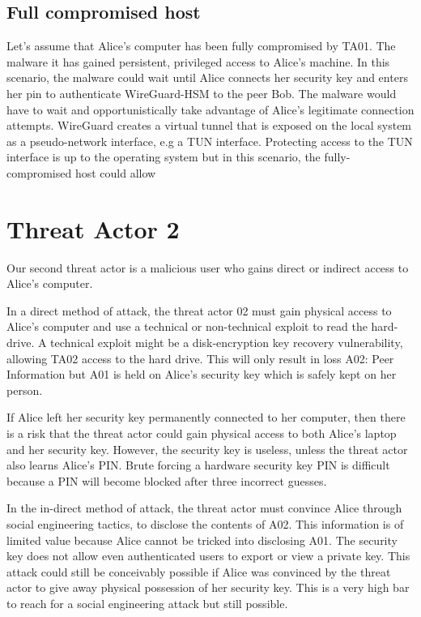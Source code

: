 \documentclass [11pt, proquest] {uwthesis}[2020/02/24]
\begin{document}
\subsection{Full compromised host}
Let's assume that Alice's computer has been fully compromised by TA01. The malware it has gained persistent, privileged access to Alice's machine. In this scenario, the malware could wait until Alice connects her security key and enters her pin to authenticate WireGuard-HSM to the peer Bob. The malware would have to wait and opportunistically take advantage of Alice's legitimate connection attempts.
WireGuard creates a virtual tunnel that is exposed on the local system as a pseudo-network interface, e.g a TUN interface. Protecting access to the TUN interface is up to the operating system but in this scenario, the fully-compromised host could allow


\section{Threat Actor 2}
Our second threat actor is a malicious user who gains direct or indirect access to Alice's computer. 

In a direct method of attack, the threat actor 02 must gain physical access to Alice's computer and use a technical or non-technical exploit to read the hard-drive. A technical exploit might be a disk-encryption key recovery vulnerability, allowing TA02 access to the hard drive. This will only result in loss A02: Peer Information but A01 is held on Alice's security key which is safely kept on her person.

If Alice left her security key permanently connected to her computer, then there is a risk that the threat actor could gain physical access to both Alice's laptop and her security key. However, the security key is useless, unless the threat actor also learns Alice's PIN. Brute forcing a hardware security key PIN is difficult because a PIN will become blocked after three incorrect guesses.

In the in-direct method of attack, the threat actor must convince Alice through social engineering tactics, to disclose the contents of A02. This information is of limited value because Alice cannot be tricked into disclosing A01. The security key does not allow even authenticated users to export or view a private key.
This attack could still be conceivably possible if Alice was convinced by the threat actor to give away physical possession of her security key. This is a very high bar to reach for a social engineering attack but still possible.
\end{document}
